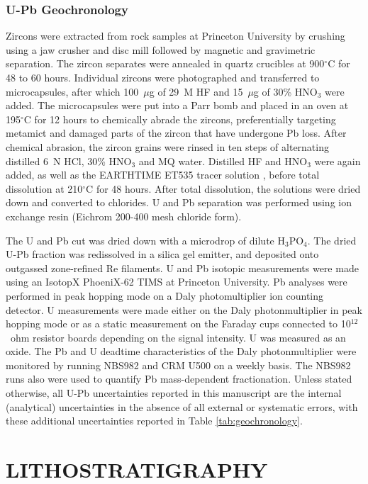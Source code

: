 \documentclass[11pt,letterpaper]{article}
\newcommand{\degC}{$^{\circ}$C\xspace}
\begin{document}
\subsubsection*{U-Pb Geochronology \label{sec:UPbGeochronology}}

Zircons were extracted from rock samples at Princeton University by crushing using a jaw crusher and disc mill followed by magnetic and gravimetric separation. The zircon separates were annealed in quartz crucibles at 900\degC for 48 to 60 hours. Individual zircons were photographed and transferred to microcapsules, after which 100~$\mu$g of 29~M HF and 15~$\mu$g of 30\% HNO$_{3}$ were added. The microcapsules were put into a Parr bomb and placed in an oven at 195\degC for 12 hours to chemically abrade the zircons, preferentially targeting metamict and damaged parts of the zircon that have undergone Pb loss. After chemical abrasion, the zircon grains were rinsed in ten steps of alternating distilled 6~N HCl, 30\% HNO$_{3}$ and MQ water. Distilled HF and HNO$_{3}$ were again added, as well as the EARTHTIME ET535 tracer solution \citep{Condon2015a, McLean2015a}, before total dissolution at 210\degC for 48 hours. After total dissolution, the solutions were dried down and converted to chlorides. U and Pb separation was performed using ion exchange resin (Eichrom 200-400 mesh chloride form). 

The U and Pb cut was dried down with a microdrop of dilute H$_{3}$PO$_{4}$. The dried U-Pb fraction was redissolved in a silica gel emitter, and deposited onto outgassed zone-refined Re filaments. U and Pb isotopic measurements were made using an IsotopX PhoeniX-62 TIMS at Princeton University. Pb analyses were performed in peak hopping mode on a Daly photomultiplier ion counting detector. U measurements were made either on the Daly photonmultiplier in peak hopping mode or as a static measurement on the Faraday cups connected to 10$^{12}$~ohm resistor boards depending on the signal intensity. U was measured as an oxide. The Pb and U deadtime characteristics of the Daly photonmultiplier were monitored by running NBS982 and CRM U500 on a weekly basis. The NBS982 runs also were used to quantify Pb mass-dependent fractionation. Unless stated otherwise, all U-Pb uncertainties reported in this manuscript are the internal (analytical) uncertainties in the absence of all external or systematic errors, with these additional uncertainties reported in Table \ref{tab:geochronology}.

\section*{LITHOSTRATIGRAPHY \label{sec:LITHOSTRATIGRAPHY}}
\end{document}
